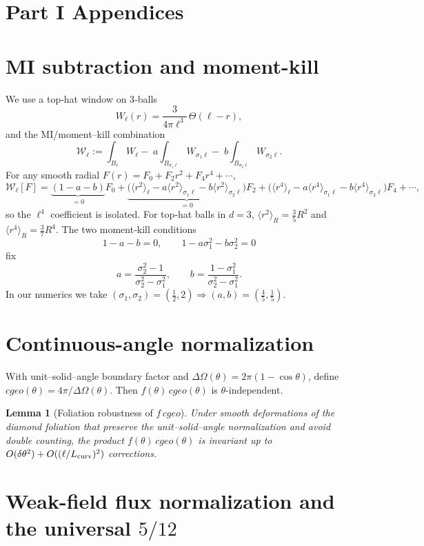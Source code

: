\documentclass[aps,prd,onecolumn,superscriptaddress,nofootinbib]{revtex4-2}
\def\cgeo{cgeo}%
\def\Omega_\Lambda{OmegaLambda}%
\providecommand{\cgeo}{c_{\rm geo}}
\newtheorem{lemma}{Lemma}
\begin{document}
\section*{Part I Appendices}

\section{MI subtraction and moment-kill}
\label{app:MI}
We use a top‑hat window on 3‑balls
\[
W_\ell(r)=\frac{3}{4\pi \ell^3}\,\Theta(\ell-r),
\]
and the MI/moment–kill combination
\[
\mathcal{W}_\ell:=\int_{B_\ell}\!W_\ell-\;a\!\int_{B_{\sigma_1\ell}}\!W_{\sigma_1\ell}-\;b\!\int_{B_{\sigma_2\ell}}\!W_{\sigma_2\ell}.
\]
For any smooth radial \(F(r)=F_0+F_2 r^2+F_4 r^4+\cdots\),
\[
\mathcal{W}_\ell[F]=\underbrace{(1-a-b)}_{=0}F_0+\underbrace{\Big(\langle r^2\rangle_\ell-a\langle r^2\rangle_{\sigma_1\ell}-b\langle r^2\rangle_{\sigma_2\ell}\Big)}_{=0}F_2+\Big(\langle r^4\rangle_\ell-a\langle r^4\rangle_{\sigma_1\ell}-b\langle r^4\rangle_{\sigma_2\ell}\Big)F_4+\cdots,
\]
so the \(\ell^4\) coefficient is isolated. For top‑hat balls in \(d{=}3\), \(\langle r^2\rangle_{R}=\tfrac{3}{5}R^2\) and \(\langle r^4\rangle_{R}=\tfrac{3}{7}R^4\). The two moment‑kill conditions
\[
1-a-b=0,\qquad 1-a\sigma_1^2-b\sigma_2^2=0
\]
fix
\[
a=\frac{\sigma_2^2-1}{\sigma_2^2-\sigma_1^2},\qquad b=\frac{1-\sigma_1^2}{\sigma_2^2-\sigma_1^2}.
\]
In our numerics we take \((\sigma_1,\sigma_2)=(\tfrac12,2)\Rightarrow (a,b)=(\tfrac45,\tfrac15)\).

 \section{Continuous-angle normalization}
\label{app:angle}
With unit–solid–angle boundary factor and \(\Delta\Omega(\theta)=2\pi(1-\cos\theta)\), define \(\cgeo(\theta)=4\pi/\Delta\Omega(\theta)\). Then \(f(\theta)\,\cgeo(\theta)\) is \(\theta\)-independent.

\begin{lemma}[Foliation robustness of \(f\,\cgeo\)]
Under smooth deformations of the diamond foliation that preserve the unit–solid–angle normalization and avoid double counting, the product \(f(\theta)\,\cgeo(\theta)\) is invariant up to \(O(\delta\theta^2)+O((\ell/L_{\rm curv})^2)\) corrections.
\end{lemma}

\section{Weak-field flux normalization and the universal \texorpdfstring{$5/12$}{5/12}}
\label{app:five-twelve}
\end{document}
